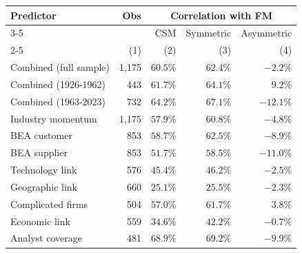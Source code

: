 \begin{tabular}{lrrrr}
  \toprule \multirow{2}{*}{Predictor} & \multirow{2}{*}{Obs} & \multicolumn{3}{c}{Correlation with FM} \\
 \cmidrule(l){3-5} & & CSM & Symmetric & Asymmetric \\
 \cmidrule(l){2-5} \vspace{5pt}  & (1) & (2) & (3) & (4) \\ 
  Combined (full sample) & 1,175 & $60.5\%$ & $62.4\%$ & $-2.2\%$ \\ 
  Combined (1926-1962) & 443 & $61.7\%$ & $64.1\%$ & $9.2\%$ \\ 
   \vspace{5pt}Combined (1963-2023) & 732 & $64.2\%$ & $67.1\%$ & $-12.1\%$ \\ 
  Industry momentum & 1,175 & $57.9\%$ & $60.8\%$ & $-4.8\%$ \\ 
  BEA customer & 853 & $58.7\%$ & $62.5\%$ & $-8.9\%$ \\ 
  BEA supplier & 853 & $51.7\%$ & $58.5\%$ & $-11.0\%$ \\ 
  Technology link & 576 & $45.4\%$ & $46.2\%$ & $-2.5\%$ \\ 
  Geographic link & 660 & $25.1\%$ & $25.5\%$ & $-2.3\%$ \\ 
  Complicated firms & 504 & $57.0\%$ & $61.7\%$ & $3.8\%$ \\ 
  Economic link & 559 & $34.6\%$ & $42.2\%$ & $-0.7\%$ \\ 
  Analyst coverage & 481 & $68.9\%$ & $69.2\%$ & $-9.9\%$ \\ 
   \bottomrule\end{tabular}
